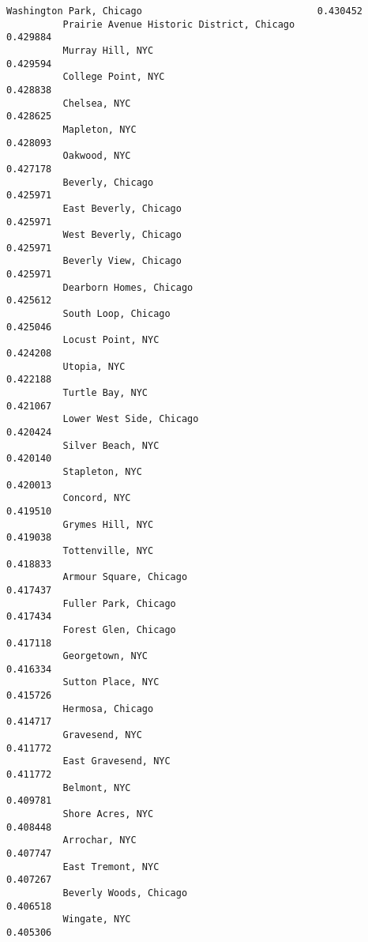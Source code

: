 \documentclass[11pt]{article}
\begin{document}
\begin{Verbatim}[commandchars=\\\{\}]
          Washington Park, Chicago                               0.430452
          Prairie Avenue Historic District, Chicago              0.429884
          Murray Hill, NYC                                       0.429594
          College Point, NYC                                     0.428838
          Chelsea, NYC                                           0.428625
          Mapleton, NYC                                          0.428093
          Oakwood, NYC                                           0.427178
          Beverly, Chicago                                       0.425971
          East Beverly, Chicago                                  0.425971
          West Beverly, Chicago                                  0.425971
          Beverly View, Chicago                                  0.425971
          Dearborn Homes, Chicago                                0.425612
          South Loop, Chicago                                    0.425046
          Locust Point, NYC                                      0.424208
          Utopia, NYC                                            0.422188
          Turtle Bay, NYC                                        0.421067
          Lower West Side, Chicago                               0.420424
          Silver Beach, NYC                                      0.420140
          Stapleton, NYC                                         0.420013
          Concord, NYC                                           0.419510
          Grymes Hill, NYC                                       0.419038
          Tottenville, NYC                                       0.418833
          Armour Square, Chicago                                 0.417437
          Fuller Park, Chicago                                   0.417434
          Forest Glen, Chicago                                   0.417118
          Georgetown, NYC                                        0.416334
          Sutton Place, NYC                                      0.415726
          Hermosa, Chicago                                       0.414717
          Gravesend, NYC                                         0.411772
          East Gravesend, NYC                                    0.411772
          Belmont, NYC                                           0.409781
          Shore Acres, NYC                                       0.408448
          Arrochar, NYC                                          0.407747
          East Tremont, NYC                                      0.407267
          Beverly Woods, Chicago                                 0.406518
          Wingate, NYC                                           0.405306

\end{Verbatim}
\end{document}
